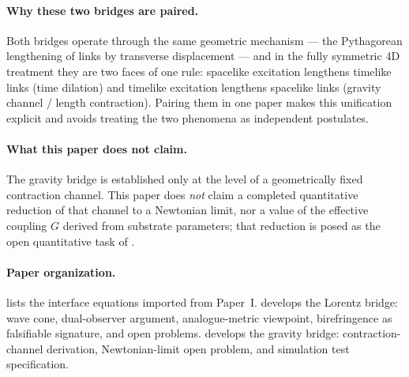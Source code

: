 \paragraph{Why these two bridges are paired.}
Both bridges operate through the same geometric mechanism --- the Pythagorean lengthening of
links by transverse displacement --- and in the fully symmetric 4D treatment they are two faces
of one rule: spacelike excitation lengthens timelike links (time dilation) and timelike
excitation lengthens spacelike links (gravity channel / length contraction).
Pairing them in one paper makes this unification explicit and avoids treating the two phenomena
as independent postulates.

\paragraph{What this paper does not claim.}
The gravity bridge is established only at the level of a geometrically fixed contraction channel.
This paper does \emph{not} claim a completed quantitative reduction of that channel to a Newtonian
limit, nor a value of the effective coupling $G$ derived from substrate parameters; that reduction
is posed as the open quantitative task of .

\paragraph{Paper organization.}
 lists the interface equations imported from Paper~I.
 develops the Lorentz bridge: wave cone, dual-observer argument, analogue-metric
viewpoint, birefringence as falsifiable signature, and open problems.
 develops the gravity bridge: contraction-channel derivation, Newtonian-limit
open problem, and simulation test specification.